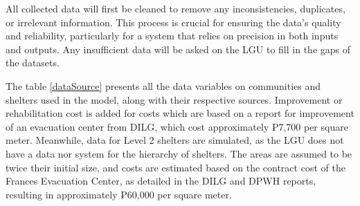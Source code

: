 	All collected data will first be cleaned to remove any inconsistencies, duplicates, or irrelevant information. This process is crucial for ensuring the data’s quality and reliability, particularly for a system that relies on precision in both inputs and outputs. Any insufficient data will be asked on the LGU to fill in the gaps of the datasets. 
	
	The table \ref{dataSource} presents all the data variables on communities and shelters used in the model, along with their respective sources. Improvement or rehabilitation cost is added for costs which are based on a report for improvement of an evacuation center from DILG, which cost approximately ₱7,700 per square meter. Meanwhile, data for Level 2 shelters are simulated, as the LGU does not have a data nor system for the hierarchy of shelters. The areas are assumed to be twice their initial size, and costs are estimated based on the contract cost of the Frances Evacuation Center, as detailed in the DILG and DPWH reports, resulting in approximately ₱60,000 per square meter.
	
